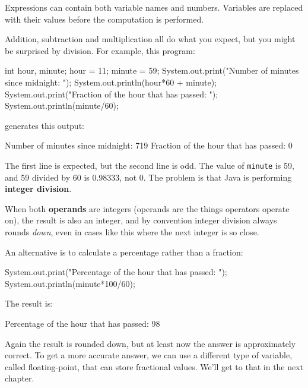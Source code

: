 Expressions can contain both variable names and numbers.
Variables are replaced with their values before the computation is performed.


Addition, subtraction and multiplication all do what you expect, but you might be surprised by division.
For example, this program:

\begin{code}
    int hour, minute;
    hour = 11;
    minute = 59;
    System.out.print("Number of minutes since midnight: ");
    System.out.println(hour*60 + minute);
    System.out.print("Fraction of the hour that has passed: ");
    System.out.println(minute/60);
\end{code}

generates this output:

\begin{stdout}
Number of minutes since midnight: 719
Fraction of the hour that has passed: 0
\end{stdout}

The first line is expected, but the second line is odd.
The value of {\tt minute} is 59, and 59 divided by 60 is 0.98333, not 0.
The problem is that Java is performing {\bf integer division}.


When both {\bf operands} are integers (operands are the things operators operate on), the result is also an integer, and by convention integer division always rounds {\em down}, even in cases like this where the next integer is so close.

An alternative is to calculate a percentage rather than a fraction:

\begin{code}
    System.out.print("Percentage of the hour that has passed: ");
    System.out.println(minute*100/60);
\end{code}

The result is:

\begin{stdout}
Percentage of the hour that has passed: 98
\end{stdout}

Again the result is rounded down, but at least now the answer is approximately correct.
To get a more accurate answer, we can use a different type of variable, called floating-point, that can store fractional values.
We'll get to that in the next chapter.


